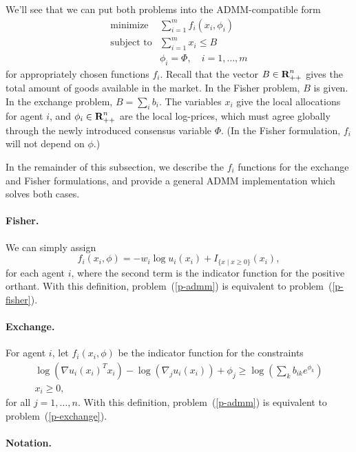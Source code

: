 \documentclass[12pt]{article}
\begin{document}
We'll see that we can put both problems into the ADMM-compatible form
\begin{equation}
\label{p-admm}
\begin{array}{ll}
\mbox{minimize} & \sum_{i=1}^m f_i(x_i, \phi_i) \\
\mbox{subject to} & \sum_{i=1}^m x_i \leq B\\
& \phi_i = \Phi, \quad i=1,\ldots,m
\end{array}
\end{equation}
for appropriately chosen functions $f_i$. Recall that the vector $B \in
{\mbox{\bf R}}^n_{++}$ gives the total amount of goods available in the market. In the
Fisher problem, $B$ is given. In the exchange problem, $B = \sum_i b_i$. The
variables $x_i$ give the local allocations for agent $i$, and $\phi_i \in
{\mbox{\bf R}}^n_{++}$ are the local log-prices, which must agree globally through the
newly introduced consensus variable $\Phi$. (In the Fisher formulation, $f_i$
will not depend on $\phi$.)

In the remainder of this subsection, we describe the $f_i$ functions for the
exchange and Fisher formulations, and provide a general ADMM implementation
which solves both cases.

\paragraph{Fisher.}
We can simply assign
\[
f_i(x_i, \phi) = -w_i \log u_i(x_i) + I_{\lbrace x \mid x \geq 0 \rbrace}(x_i),
\]
for each agent $i$,
where the second term is the indicator function for the positive orthant.
With this definition, problem~(\ref{p-admm}) is equivalent to
problem~(\ref{p-fisher}).

\paragraph{Exchange.}

For agent $i$, let $f_i(x_i, \phi)$ be the indicator function for the
constraints
\[
\begin{array}{c}
\log(\nabla u_i(x_i)^T x_i) - \log(\nabla_j u_i(x_i)) + \phi_j \geq  \log\left(\sum_k b_{ik} e^{\phi_{k}}\right)\\
x_i \geq 0,
\end{array}
\]
for all $j=1,\ldots,n$.
With this definition, problem~(\ref{p-admm}) is equivalent to problem~(\ref{p-exchange}).


\paragraph{Notation.}
\end{document}
